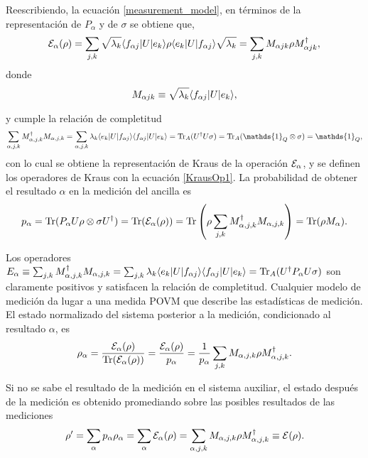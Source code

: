 Reescribiendo, la ecuación {\ref{measurement_model}}, en términos de la representación de $P_\alpha$ y de $\sigma$ se obtiene que,
\begin{equation}
    \mathcal{E}_\alpha(\rho)=\sum_{j,k}\sqrt{\lambda_k}\langle f_{\alpha j}|U|e_k\rangle \rho \langle e_k|U|f_{\alpha j}\rangle \sqrt{\lambda_k}=\sum_{j,k}M_{\alpha j k}\rho M_ {\alpha j k}^\dagger,
\end{equation}
donde \begin{equation} \label{KrausOp1}
    M_{\alpha j k}\equiv \sqrt{\lambda_k}\langle f_{\alpha j}|U|e_k\rangle, 
\end{equation}

y cumple la relación de completitud \[\sum_{\alpha, j,k} M_{\alpha,j,k}^\dagger M_{\alpha,j,k}=\sum_{\alpha, j,k} \lambda_k \la e_k|U|f_{\alpha j}\ra \la f_{\alpha j}|U|e_k\ra= \tr_A(U^\dagger U \sigma)=\tr_A(\mathds{1}_Q\otimes\sigma)=\mathds{1}_Q,\] con lo cual se obtiene la representación de Kraus de la operación $\mathcal{E}_\alpha$, y se definen los operadores de Kraus con la ecuación {\ref{KrausOp1}}. La probabilidad de obtener el resultado $\alpha$ en la medición del ancilla es {\cite{unm2014}}
\begin{equation}
    p_\alpha={\rm Tr}(P_\alpha U\rho\otimes\sigma U^\dagger)={\rm Tr}(\mathcal{E}_\alpha(\rho))={\rm Tr}\left(\rho \sum _{j,k} M_{\alpha, j,k}^\dagger M_{\alpha,j,k}\right)={\rm Tr}(\rho M_\alpha).
\end{equation}


Los operadores $E_\alpha \equiv \sum _{j,k} M_{\alpha, j,k}^\dagger M_{\alpha,j,k}=\sum_{j,k} \lambda_k \langle e_k|U|f_{\alpha j}\rangle \langle f_{\alpha j}|U|e_k\rangle={\rm Tr}_A(U^\dagger P_\alpha U\sigma) $ son claramente positivos y satisfacen la relación de completitud. Cualquier modelo de medición da lugar a una medida POVM que describe las estadísticas de medición. El estado normalizado del sistema posterior a la medición, condicionado al resultado $\alpha$, es {\cite{unm2014}}
\begin{equation}
    \rho_\alpha =\dfrac{\mathcal{E}_\alpha (\rho)}{{\rm Tr}(\mathcal{E}_\alpha(\rho))}=\dfrac{\mathcal{E}_\alpha(\rho)}{p_\alpha}=\dfrac{1}{p_\alpha}\sum_{j,k}M_{\alpha,j,k}\rho M_{\alpha,j,k}^\dagger.
\end{equation}

Si no se sabe el resultado de la medición en el sistema auxiliar, el estado después de la medición es obtenido promediando sobre las posibles resultados de las mediciones {\cite{unm2014}}
\begin{equation}
    \rho'=\sum_\alpha p_\alpha \rho_\alpha=\sum_\alpha \mathcal{E}_\alpha(\rho)=\sum_{\alpha,j,k} M_{\alpha,j,k}\rho M_{\alpha,j,k}^\dagger\equiv\mathcal{E}(\rho).
\end{equation}


